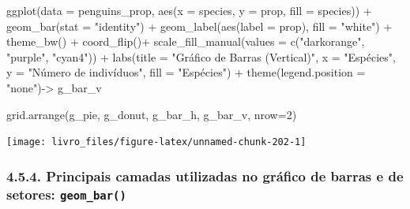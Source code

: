 \documentclass[
]{book}
\newenvironment{Shaded}{\begin{snugshade}}{\end{snugshade}}
\newcommand{\AttributeTok}[1]{\textcolor[rgb]{0.61,0.61,0.61}{#1}}
\newcommand{\DecValTok}[1]{\textcolor[rgb]{0.06,0.06,0.06}{#1}}
\newcommand{\FunctionTok}[1]{\textcolor[rgb]{0,0,0}{#1}}
\newcommand{\NormalTok}[1]{#1}
\newcommand{\OtherTok}[1]{\textcolor[rgb]{0.37,0.37,0.37}{#1}}
\newcommand{\SpecialCharTok}[1]{\textcolor[rgb]{0,0,0}{#1}}
\newcommand{\StringTok}[1]{\textcolor[rgb]{0.5,0.5,0.5}{#1}}
\begin{document}
\begin{Shaded}
\begin{Highlighting}[]
\FunctionTok{ggplot}\NormalTok{(}\AttributeTok{data =}\NormalTok{ penguins\_prop, }
       \FunctionTok{aes}\NormalTok{(}\AttributeTok{x =}\NormalTok{ species, }\AttributeTok{y =}\NormalTok{ prop, }\AttributeTok{fill =}\NormalTok{ species)) }\SpecialCharTok{+}
  \FunctionTok{geom\_bar}\NormalTok{(}\AttributeTok{stat =} \StringTok{"identity"}\NormalTok{) }\SpecialCharTok{+}
  \FunctionTok{geom\_label}\NormalTok{(}\FunctionTok{aes}\NormalTok{(}\AttributeTok{label =}\NormalTok{ prop), }
             \AttributeTok{fill =} \StringTok{"white"}\NormalTok{) }\SpecialCharTok{+}
  \FunctionTok{theme\_bw}\NormalTok{() }\SpecialCharTok{+}
  \FunctionTok{coord\_flip}\NormalTok{()}\SpecialCharTok{+}
  \FunctionTok{scale\_fill\_manual}\NormalTok{(}\AttributeTok{values =} \FunctionTok{c}\NormalTok{(}\StringTok{"darkorange"}\NormalTok{, }\StringTok{"purple"}\NormalTok{, }\StringTok{"cyan4"}\NormalTok{)) }\SpecialCharTok{+}
  \FunctionTok{labs}\NormalTok{(}\AttributeTok{title =} \StringTok{"Gráfico de Barras (Vertical)"}\NormalTok{, }\AttributeTok{x =} \StringTok{"Espécies"}\NormalTok{, }\AttributeTok{y =} \StringTok{"Número de indivíduos"}\NormalTok{, }\AttributeTok{fill =} \StringTok{"Espécies"}\NormalTok{) }\SpecialCharTok{+}
  \FunctionTok{theme}\NormalTok{(}\AttributeTok{legend.position =} \StringTok{"none"}\NormalTok{)}\OtherTok{{-}\textgreater{}}\NormalTok{ g\_bar\_v}


\FunctionTok{grid.arrange}\NormalTok{(g\_pie, g\_donut, g\_bar\_h, g\_bar\_v, }\AttributeTok{nrow=}\DecValTok{2}\NormalTok{)}
\end{Highlighting}
\end{Shaded}

\begin{center}\texttt{[image: livro\_files/figure-latex/unnamed-chunk-202-1]} \end{center}

\hypertarget{principais-camadas-utilizadas-no-gruxe1fico-de-barras-e-de-setores-geom_bar}{%
\subsubsection{\texorpdfstring{4.5.4. Principais camadas utilizadas no gráfico de barras e de setores: \texttt{geom\_bar()}}{4.5.4. Principais camadas utilizadas no gráfico de barras e de setores: geom\_bar()}}\label{principais-camadas-utilizadas-no-gruxe1fico-de-barras-e-de-setores-geom_bar}}
\end{document}
